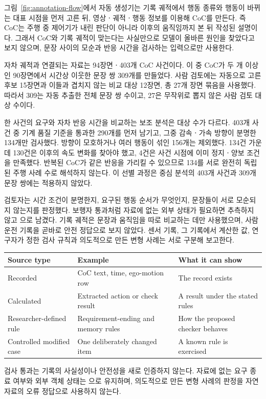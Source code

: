 그림~\ref{fig:annotation-flow}에서 자동 생성기는 기록 궤적에서 행동 종류와 행동이 바뀌는 대표 시점을 먼저 고른 뒤, 영상ㆍ궤적ㆍ행동 정보를 이용해 CoC를 만든다. 즉 CoC는 주행 중 제어기가 내린 판단이 아니라 이후의 움직임까지 본 뒤 작성된 설명이다. 그래서 CoC와 기록 궤적이 맞는다는 사실만으로 모델이 올바른 원인을 찾았다고 보지 않으며, 문장 사이의 모순과 반응 시간을 검사하는 입력으로만 사용한다.

자차 궤적과 연결되는 자료는 94장면ㆍ403개 CoC 사건이다. 이 중 CoC가 두 개 이상인 90장면에서 시간상 이웃한 문장 쌍 309개를 만들었다. 사람 검토에는 자동으로 고른 후보 15장면과 이들과 겹치지 않는 비교 대상 12장면, 총 27개 장면 묶음을 사용했다. 따라서 309는 자동 추출한 전체 문장 쌍 수이고, 27은 무작위로 뽑지 않은 사람 검토 대상 수이다.

한 사건의 요구와 자차 반응 시간을 비교하는 보조 분석은 대상 수가 다르다. 403개 사건 중 기계 품질 기준을 통과한 290개를 먼저 남기고, 그중 감속ㆍ가속 방향이 분명한 134개만 검사했다. 방향이 모호하거나 여러 행동이 섞인 156개는 제외했다. 134건 가운데 130건은 이후의 속도 변화를 찾아야 했고, 4건은 사건 시점에 이미 정지ㆍ양보 조건을 만족했다. 반복된 CoC가 같은 반응을 가리킬 수 있으므로 134를 서로 완전히 독립된 주행 사례 수로 해석하지 않는다. 이 선별 과정은 중심 분석의 403개 사건과 309개 문장 쌍에는 적용하지 않았다.

검토자는 시간 조건이 분명한지, 요구된 행동 순서가 무엇인지, 문장들이 서로 모순되지 않는지를 판정했다. 보행자 통과처럼 자료에 없는 외부 상태가 필요하면 추측하지 않고 {\unknown}으로 남겼다. 기록 궤적은 문장과 움직임을 따로 비교하는 데만 사용했으며, 사람 운전 기록을 곧바로 안전 정답으로 보지 않았다. 센서 기록, 그 기록에서 계산한 값, 연구자가 정한 검사 규칙과 의도적으로 만든 변형 사례는 서로 구분해 보고한다.

\begin{table}[t]
\centering
{}
\label{tab:evidence-level}
\footnotesize
\begin{tabularx}{\columnwidth}{L{0.25\columnwidth}YY}
\toprule
Source type & Example & What it can show \\
\midrule
Recorded & CoC text, time, ego-motion row & The record exists \\
Calculated & Extracted action or check result & A result under the stated rules \\
Researcher-defined rule & Requirement-ending and memory rules & How the proposed checker behaves \\
Controlled modified case & One deliberately changed item & A known rule is exercised \\
\bottomrule
\end{tabularx}
\end{table}

검사 통과는 기록의 사실성이나 안전성을 새로 인증하지 않는다. 자료에 없는 요구 종료 여부와 외부 객체 상태는 {\unknown}으로 유지하며, 의도적으로 만든 변형 사례의 판정을 자연 자료의 오류 정답으로 사용하지 않는다.
